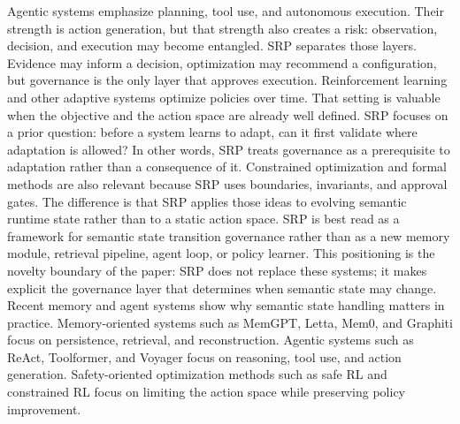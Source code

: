 {}Agentic systems emphasize planning, tool use, and autonomous execution. Their strength is action generation, but that strength also creates a risk: observation, decision, and execution may become entangled. SRP separates those layers. Evidence may inform a decision, optimization may recommend a configuration, but governance is the only layer that approves execution.\markdownRendererParagraphSeparator
{}Reinforcement learning and other adaptive systems optimize policies over time. That setting is valuable when the objective and the action space are already well defined. SRP focuses on a prior question: before a system learns to adapt, can it first validate where adaptation is allowed? In other words, SRP treats governance as a prerequisite to adaptation rather than a consequence of it.\markdownRendererParagraphSeparator
{}Constrained optimization and formal methods are also relevant because SRP uses boundaries, invariants, and approval gates. The difference is that SRP applies those ideas to evolving semantic runtime state rather than to a static action space.\markdownRendererInterblockSeparator
{}\markdownRendererSectionBegin
{}\markdownRendererInterblockSeparator
{}SRP is best read as a framework for semantic state transition governance rather than as a new memory module, retrieval pipeline, agent loop, or policy learner.\markdownRendererInterblockSeparator
{}\markdownRendererInterblockSeparator
{}This positioning is the novelty boundary of the paper: SRP does not replace these systems; it makes explicit the governance layer that determines when semantic state may change.\markdownRendererInterblockSeparator
{}
\markdownRendererSectionEnd \markdownRendererSectionBegin
{}\markdownRendererInterblockSeparator
{}Recent memory and agent systems show why semantic state handling matters in practice. Memory-oriented systems such as MemGPT, Letta, Mem0, and Graphiti focus on persistence, retrieval, and reconstruction. Agentic systems such as ReAct, Toolformer, and Voyager focus on reasoning, tool use, and action generation. Safety-oriented optimization methods such as safe RL and constrained RL focus on limiting the action space while preserving policy improvement.\markdownRendererParagraphSeparator
